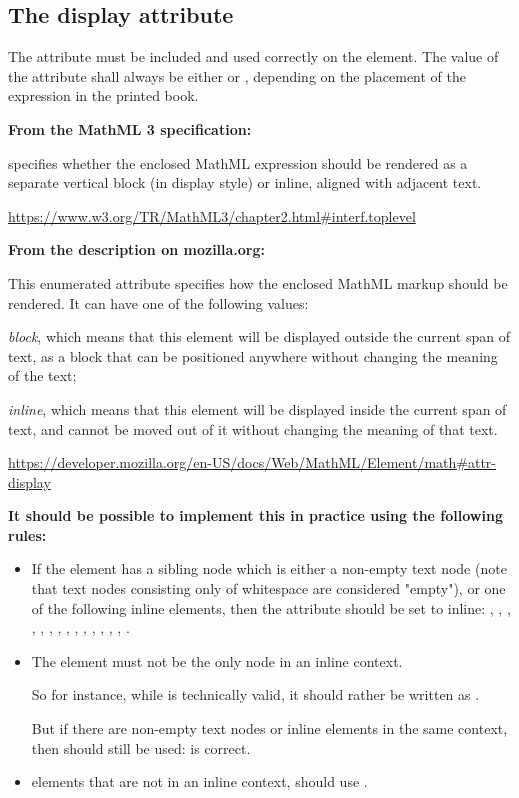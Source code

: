 \documentclass[english,a4paper,11pt]{article}
\begin{document}
\subsection{The display attribute}

The  attribute must be included and used correctly on the  element. The value of the  attribute shall always be either  or , depending on the placement of the expression in the printed book.

\bigskip
\textbf{From the MathML 3 specification:}

specifies whether the enclosed MathML expression should be rendered as a separate vertical block (in display style) or inline, aligned with adjacent text.

\url{https://www.w3.org/TR/MathML3/chapter2.html#interf.toplevel}

\bigskip
\textbf{From the description on mozilla.org:}

This enumerated attribute specifies how the enclosed MathML markup should be rendered. It can have one of the following values:

\textit{block}, which means that this element will be displayed outside the current span of text, as a block that can be positioned anywhere without changing the meaning of the text;

\textit{inline}, which means that this element will be displayed inside the current span of text, and cannot be moved out of it without changing the meaning of that text.

\url{https://developer.mozilla.org/en-US/docs/Web/MathML/Element/math#attr-display}

\bigskip
\textbf{It should be possible to implement this in practice using the following rules:}
\begin{itemize}
    \item If the  element has a sibling node which is either a non-empty text node (note that text nodes consisting only of whitespace are considered "empty"), or one of the following inline elements, then the  attribute should be set to inline: , , , , , , , , , , , , , , .
    \item The  element must not be the only node in an inline context.
    
    So for instance, while  is technically valid, it should rather be written as . 
    
    But if there are non-empty text nodes or inline elements in the same context, then  should still be used:  is correct.
    \item {} elements that are not in an inline context, should use .
\end{itemize}
\end{document}
